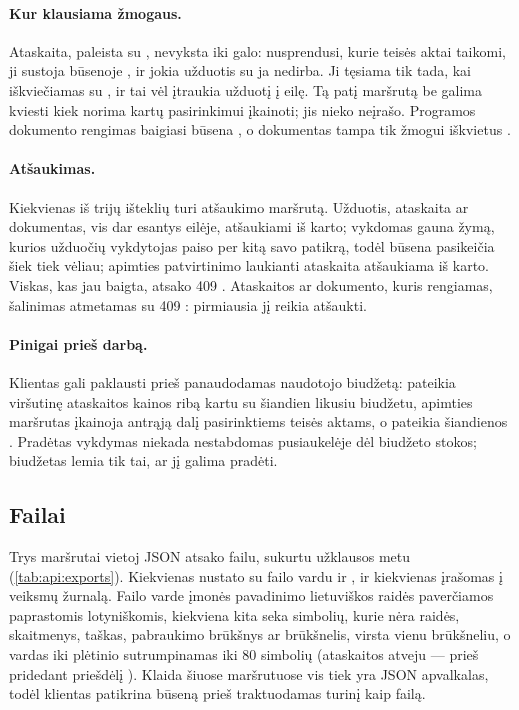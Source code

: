 \paragraph{Kur klausiama žmogaus.} Ataskaita, paleista su , nevyksta iki galo:
nusprendusi, kurie teisės aktai taikomi, ji sustoja būsenoje , ir jokia
užduotis su ja nedirba. Ji tęsiama tik tada, kai  iškviečiamas
su , ir tai vėl įtraukia užduotį į eilę. Tą patį maršrutą be
 galima kviesti kiek norima kartų pasirinkimui įkainoti; jis nieko neįrašo.
Programos dokumento rengimas baigiasi būsena , o  dokumentas tampa tik
žmogui iškvietus .

\paragraph{Atšaukimas.} Kiekvienas iš trijų išteklių turi atšaukimo maršrutą. Užduotis, ataskaita
ar dokumentas, vis dar esantys eilėje, atšaukiami iš karto; vykdomas gauna žymą, kurios užduočių
vykdytojas paiso per kitą savo patikrą, todėl būsena pasikeičia šiek tiek vėliau; apimties
patvirtinimo laukianti ataskaita atšaukiama iš karto. Viskas, kas jau baigta, atsako 409
. Ataskaitos ar dokumento, kuris rengiamas, šalinimas atmetamas su 409
: pirmiausia jį reikia atšaukti.

\paragraph{Pinigai prieš darbą.} Klientas gali paklausti prieš panaudodamas naudotojo biudžetą:
 pateikia viršutinę ataskaitos kainos ribą kartu su šiandien
likusiu biudžetu, apimties maršrutas įkainoja antrąją dalį pasirinktiems teisės aktams, o
 pateikia šiandienos . Pradėtas vykdymas niekada nestabdomas
pusiaukelėje dėl biudžeto stokos; biudžetas lemia tik tai, ar jį galima pradėti.

\subsection{Failai}\label{sec:api:files}

Trys maršrutai vietoj JSON atsako failu, sukurtu užklausos metu (\cref{tab:api:exports}).
Kiekvienas nustato  su failo vardu ir
, ir kiekvienas įrašomas į veiksmų žurnalą. Failo varde įmonės pavadinimo
lietuviškos raidės paverčiamos paprastomis lotyniškomis, kiekviena kita seka simbolių, kurie
nėra raidės, skaitmenys, taškas, pabraukimo brūkšnys ar brūkšnelis, virsta vienu brūkšneliu, o
vardas iki plėtinio sutrumpinamas iki 80 simbolių (ataskaitos atveju --- prieš pridedant priešdėlį
). Klaida šiuose maršrutuose vis tiek yra JSON apvalkalas, todėl klientas
patikrina būseną prieš traktuodamas turinį kaip failą.

